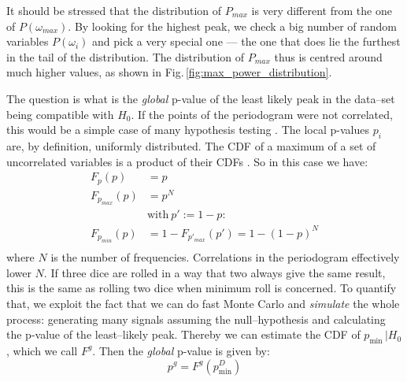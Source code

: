
It should be stressed that the distribution of $P_{max}$ is very different from the one of $P(\omega_{max})$. By looking for the highest peak, we check a big number of random variables $P(\omega_i)$ and pick a very special one --- the one that does lie the furthest in the tail of the distribution. The distribution of $P_{max}$ thus is centred around much higher values, as shown in Fig.\,\ref{fig:max_power_distribution}.

The question is what is the \emph{global} p-value of the least likely peak in the data--set being compatible with $H_0$. If the points of the periodogram were not correlated, this would be a simple case of many hypothesis testing \cite{Algeri2016}. The local p-values $p_i$ are, by definition, uniformly distributed. The CDF of a maximum of a set of uncorrelated variables is a product of their CDFs . So in this case we have:
\begin{align}
  F_p(p) &= p \\
  F_{p_{max}}(p) &= p^N \\
  &\text{with}\ p' := 1 - p :\\
  F_{p_{min}}(p) &= 1 - F_{p'_{max}}(p') = 1 - (1 - p)^N \label{eq:Fpmin}\\
\end{align}
where $N$ is the number of frequencies. Correlations in the periodogram effectively lower $N$. If three dice are rolled in a way that two always give the same result, this is the same as rolling two dice when minimum roll is concerned. To quantify that, we exploit the fact that we can do fast Monte Carlo and \emph{simulate} the whole process: generating many signals assuming the null--hypothesis and calculating the p-value of the least--likely peak. Thereby we can estimate the CDF of $p_{\mathrm{min}} \, | H_0$, which we call $F^g$. Then the \emph{global} p-value is given by:
\begin{equation}
  p^g = F^g(p_{\mathrm{min}}^D)
\end{equation}

